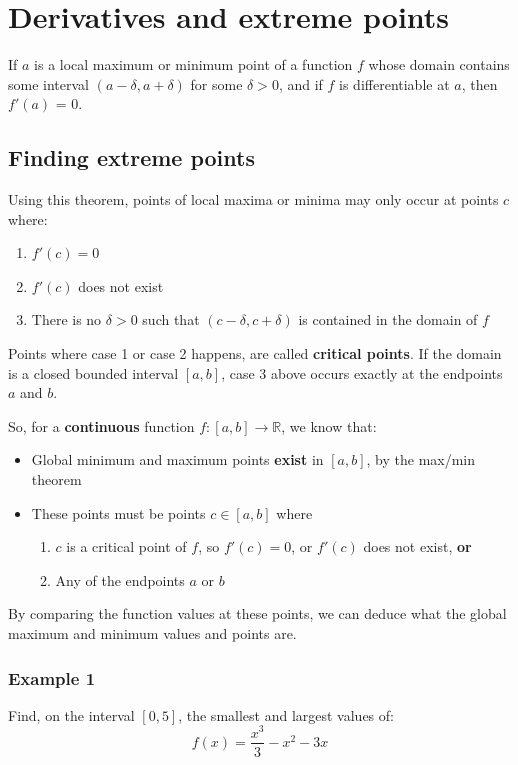 \documentclass[11pt]{article}
\begin{document}
\newpage
\section{Derivatives and extreme points}
\label{sec:org70a2498}
If \(a\) is a local maximum or minimum point of a function \(f\) whose domain contains some interval \((a - \delta, a + \delta)\) for some \(\delta > 0\), and if \(f\) is differentiable at \(a\), then \(f'(a)\) = 0.
\subsection{Finding extreme points}
\label{sec:org47b1efc}
Using this theorem, points of local maxima or minima may only occur at points \(c\) where:
\begin{enumerate}
\item \(f'(c) = 0\)
\item \(f'(c)\) does not exist
\item There is no \(\delta > 0\) such that \((c - \delta, c + \delta)\) is contained in the domain of \(f\)
\end{enumerate}

Points where case 1 or case 2 happens, are called \textbf{critical points}. If the domain is a closed bounded interval \([a, b]\), case 3 above occurs exactly at the endpoints \(a\) and \(b\).


So, for a \textbf{continuous} function \(f : [a, b] \rightarrow \mathbb{R}\), we know that:
\begin{itemize}
\item Global minimum and maximum points \textbf{exist} in \([a, b]\), by the max/min theorem
\item These points must be points \(c \in [a, b]\) where
\begin{enumerate}
\item \(c\) is a critical point of \(f\), so \(f'(c) = 0\), or \(f'(c)\) does not exist, \textbf{or}
\item Any of the endpoints \(a\) or \(b\)
\end{enumerate}
\end{itemize}

By comparing the function values at these points, we can deduce what the global maximum and minimum values and points are.

\newpage
\subsubsection{Example 1}
\label{sec:orgacaac00}
Find, on the interval \([0, 5]\), the smallest and largest values of:
\[f(x) = \frac{x^3}{3} - x^2 - 3x\]
\end{document}
